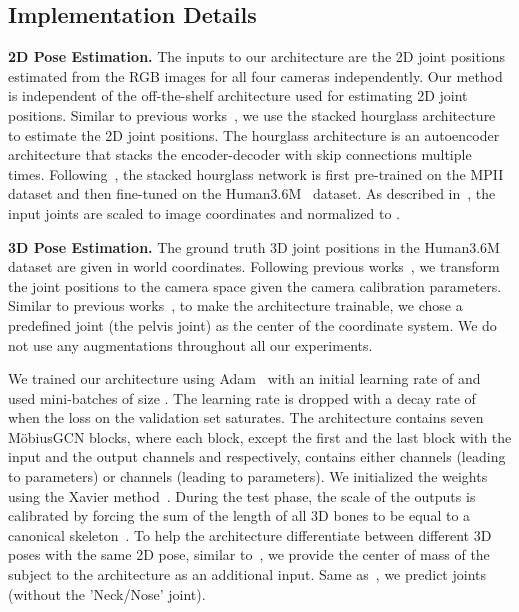 \documentclass[runningheads]{llncs}
\begin{document}
\subsection{Implementation Details}
\textbf{2D Pose Estimation.} The inputs to our architecture are the 2D joint positions estimated from the RGB images for all four cameras independently. Our method is independent of the off-the-shelf architecture used for estimating 2D joint positions. Similar to previous works~\cite{martinez2017simple, zhaoCVPR19semantic}, we use the stacked hourglass architecture~\cite{newell2016stacked} to estimate the 2D joint positions. The hourglass architecture is an autoencoder architecture that stacks the encoder-decoder with skip connections multiple times. Following~\cite{zhaoCVPR19semantic}, the stacked hourglass network is first pre-trained on the MPII~\cite{andriluka14cvpr} dataset and then fine-tuned on the Human3.6M~\cite{h36m_pami} dataset. As described in~\cite{pavllo20193d}, the input joints are scaled to image coordinates and normalized to .


\textbf{3D Pose Estimation.} The ground truth 3D joint positions in the Human3.6M dataset are given in world coordinates. Following previous works~\cite{zhaoCVPR19semantic, martinez2017simple}, we transform the joint positions to the camera space given the camera calibration parameters.
Similar to previous works~\cite{zhaoCVPR19semantic, martinez2017simple}, to make the architecture trainable, we chose a predefined joint (the pelvis joint) as the center of the coordinate system. We do not use any augmentations throughout all our experiments.

We trained our architecture using Adam~\cite{kingma2014adam} with an initial learning rate of  and used mini-batches of size . The learning rate is dropped with a decay rate of  when the loss on the validation set saturates. The architecture contains seven M\"obiusGCN blocks, where each block, except the first and the last block with the input and the output channels  and  respectively, contains either  channels (leading to  parameters) or  channels (leading to  parameters). We initialized the weights using the Xavier method~\cite{glorot2010understanding}. 
During the test phase, the scale of the outputs is calibrated by forcing the sum of the length of all 3D bones to be equal to a canonical skeleton~\cite{pavlakos2017coarse, zhou2017towards, zhou2018monocap}. To help the architecture differentiate between different 3D poses with the same 2D pose, similar to~\citet{poier2018learning}, we provide the center of mass of the subject to the architecture as an additional input. Same as~\cite{martinez2017simple, zhaoCVPR19semantic}, we predict  joints (\ie without the 'Neck/Nose' joint).
\end{document}

